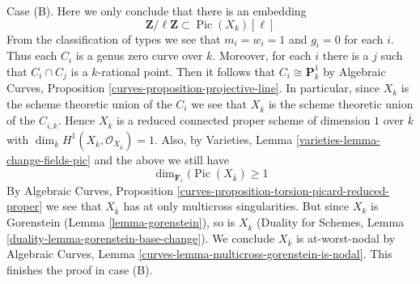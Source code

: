\documentclass{stacks-project}
\theoremstyle{plain}
\theoremstyle{definition}
\theoremstyle{remark}
\numberwithin{equation}{subsection}
\def\Pic{\mathop{\mathrm{Pic}}\nolimits}
\begin{document}
\medskip\noindent
Case (B). Here we only conclude that there is an embedding
$$
\mathbf{Z}/\ell \mathbf{Z} \subset \Pic(X_k)[\ell]
$$
From the classification of types we see that $m_i = w_i = 1$ and $g_i = 0$
for each $i$. Thus each $C_i$ is a genus zero curve over $k$.
Moreover, for each $i$ there is a $j$ such that
$C_i \cap C_j$ is a $k$-rational point. Then it follows that
$C_i \cong \mathbf{P}^1_k$ by
Algebraic Curves, Proposition \ref{curves-proposition-projective-line}.
In particular, since $X_k$ is the scheme theoretic union of the
$C_i$ we see that $X_{\overline{k}}$ is the
scheme theoretic union of the $C_{i, \overline{k}}$.
Hence $X_{\overline{k}}$ is a reduced connected proper
scheme of dimension $1$ over $\overline{k}$ with $\dim_{\overline{k}}
H^1(X_{\overline{k}}, \mathcal{O}_{X_{\overline{k}}}) = 1$.
Also, by Varieties, Lemma \ref{varieties-lemma-change-fields-pic}
and the above we still have
$$
\dim_{\mathbf{F}_\ell}(\Pic(X_{\overline{k}}) \geq 1
$$
By Algebraic Curves, Proposition
\ref{curves-proposition-torsion-picard-reduced-proper}
we see that $X_{\overline{k}}$ has at only multicross singularities.
But since $X_k$ is Gorenstein (Lemma \ref{lemma-gorenstein}),
so is $X_{\overline{k}}$ (Duality for Schemes, Lemma
\ref{duality-lemma-gorenstein-base-change}).
We conclude $X_{\overline{k}}$ is at-worst-nodal by
Algebraic Curves, Lemma \ref{curves-lemma-multicross-gorenstein-is-nodal}.
This finishes the proof in case (B).
\end{document}
